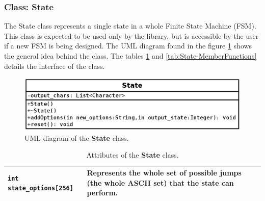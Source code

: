 \documentclass[11pt,twoside,openany,x11names,svgnames]{memoir}
\begin{document}
\subsubsection{Class: State}\label{Class-State}

The State class represents a single state in a whole Finite State Machine (FSM). This class is expected to be used only by the library, but is accessible by the user if a new FSM is being designed. The UML diagram found in the figure \ref{fig:class-state} shows the general idea behind the class. The tables \ref{tab:State-Attributes} and \ref{tab:State-MemberFunctions} details the interface of the class.

\begin{figure}
	\centering
	\includegraphics[scale=0.4, clip=true, trim= 0pt 0pt 0pt 0pt]{images/chapter03-image09}
	\caption{UML diagram of the \textbf{State} class.}
	\label{fig:class-state}
\end{figure}

\begin{table}[h]\footnotesize
\centering
\begin{tabular}{| >{\bfseries}p{4cm} | p{11.5cm} |}
	\hline
	
	\texttt{int state\_options[256]} & Represents the whole set of possible jumps (the whole ASCII set) that the state can perform. \\
	
	\hline
\end{tabular}
\caption{Attributes of the \textbf{State} class.}
\label{tab:State-Attributes}
\end{table}
\end{document}
